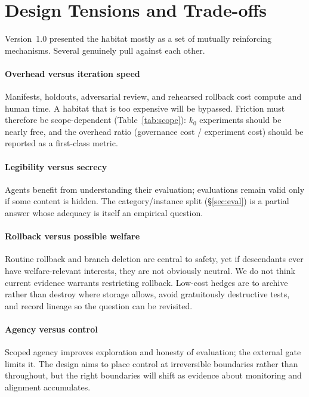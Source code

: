 \documentclass[11pt,a4paper]{article}
\begin{document}
\section{Design Tensions and Trade-offs}\label{sec:tensions}
Version~1.0 presented the habitat mostly as a set of mutually reinforcing mechanisms. Several genuinely pull against each other.

\paragraph{Overhead versus iteration speed} Manifests, holdouts, adversarial review, and rehearsed rollback cost compute and human time. A habitat that is too expensive will be bypassed. Friction must therefore be scope-dependent (Table~\ref{tab:scope}): $k_0$ experiments should be nearly free, and the overhead ratio (governance cost / experiment cost) should be reported as a first-class metric.

\paragraph{Legibility versus secrecy} Agents benefit from understanding their evaluation; evaluations remain valid only if some content is hidden. The category/instance split (\S\ref{sec:eval}) is a partial answer whose adequacy is itself an empirical question.

\paragraph{Rollback versus possible welfare} Routine rollback and branch deletion are central to safety, yet if descendants ever have welfare-relevant interests, they are not obviously neutral. We do not think current evidence warrants restricting rollback. Low-cost hedges are to archive rather than destroy where storage allows, avoid gratuitously destructive tests, and record lineage so the question can be revisited.

\paragraph{Agency versus control} Scoped agency improves exploration and honesty of evaluation; the external gate limits it. The design aims to place control at irreversible boundaries rather than throughout, but the right boundaries will shift as evidence about monitoring and alignment accumulates.
\end{document}
